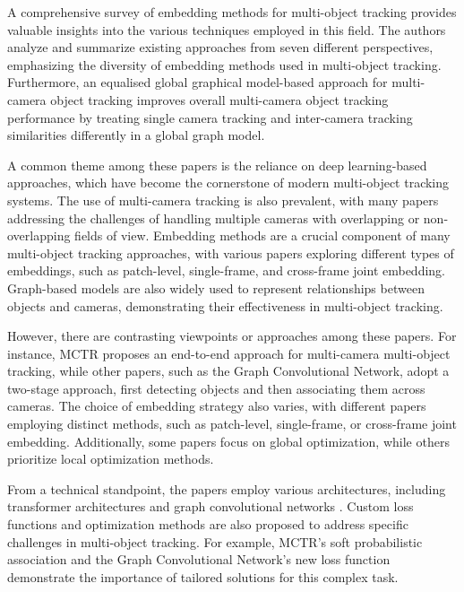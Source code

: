 \documentclass[conference]{IEEEtran}
\begin{document}
A comprehensive survey of embedding methods for multi-object tracking \cite{Title of Recent Advances in Embedding Methods paper} provides valuable insights into the various techniques employed in this field. The authors analyze and summarize existing approaches from seven different perspectives, emphasizing the diversity of embedding methods used in multi-object tracking. Furthermore, an equalised global graphical model-based approach for multi-camera object tracking \cite{Title of An equalised global graphical model-based approach paper} improves overall multi-camera object tracking performance by treating single camera tracking and inter-camera tracking similarities differently in a global graph model.

A common theme among these papers is the reliance on deep learning-based approaches, which have become the cornerstone of modern multi-object tracking systems. The use of multi-camera tracking is also prevalent, with many papers addressing the challenges of handling multiple cameras with overlapping or non-overlapping fields of view. Embedding methods are a crucial component of many multi-object tracking approaches, with various papers exploring different types of embeddings, such as patch-level, single-frame, and cross-frame joint embedding. Graph-based models are also widely used to represent relationships between objects and cameras, demonstrating their effectiveness in multi-object tracking.

However, there are contrasting viewpoints or approaches among these papers. For instance, MCTR proposes an end-to-end approach for multi-camera multi-object tracking, while other papers, such as the Graph Convolutional Network, adopt a two-stage approach, first detecting objects and then associating them across cameras. The choice of embedding strategy also varies, with different papers employing distinct methods, such as patch-level, single-frame, or cross-frame joint embedding. Additionally, some papers focus on global optimization, while others prioritize local optimization methods.

From a technical standpoint, the papers employ various architectures, including transformer architectures \cite{Title of MCTR paper} and graph convolutional networks \cite{Title of Graph Convolutional Network paper}. Custom loss functions and optimization methods are also proposed to address specific challenges in multi-object tracking. For example, MCTR's soft probabilistic association and the Graph Convolutional Network's new loss function demonstrate the importance of tailored solutions for this complex task.
\end{document}
